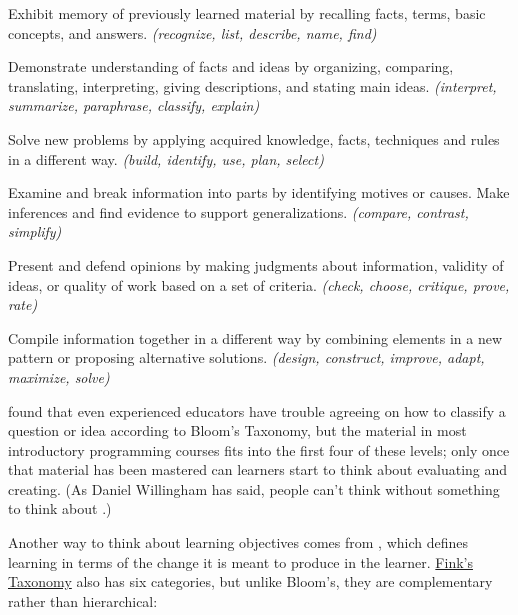\begin{description}
\tightlist
\item[Remembering:]
Exhibit memory of previously learned material by recalling facts,
terms, basic concepts, and answers. \emph{(recognize, list, describe,
name, find)}
\item[Understanding:]
Demonstrate understanding of facts and ideas by organizing,
comparing, translating, interpreting, giving descriptions, and
stating main ideas. \emph{(interpret, summarize, paraphrase, classify,
explain)}
\item[Applying:]
Solve new problems by applying acquired knowledge, facts, techniques
and rules in a different way. \emph{(build, identify, use, plan, select)}
\item[Analyzing:]
Examine and break information into parts by identifying motives or
causes. Make inferences and find evidence to support
generalizations. \emph{(compare, contrast, simplify)}
\item[Evaluating:]
Present and defend opinions by making judgments about information,
validity of ideas, or quality of work based on a set of criteria.
\emph{(check, choose, critique, prove, rate)}
\item[Creating:]
Compile information together in a different way by combining
elements in a new pattern or proposing alternative solutions.
\emph{(design, construct, improve, adapt, maximize, solve)}
\end{description}

\cite{Masa2018} found that even experienced educators have trouble
agreeing on how to classify a question or idea according to Bloom's
Taxonomy, but the material in most introductory programming courses
fits into the first four of these levels; only once that material has
been mastered can learners start to think about evaluating and
creating. (As Daniel Willingham has said, people can't think without
something to think about \cite{Will2010}.)

Another way to think about learning objectives comes from
\cite{Fink2013}, which defines learning in terms of the change it
is meant to produce in the learner. \protect\hyperlink{g:finks-taxonomy}{Fink's
Taxonomy} also has six categories, but unlike
Bloom's, they are complementary rather than hierarchical:

